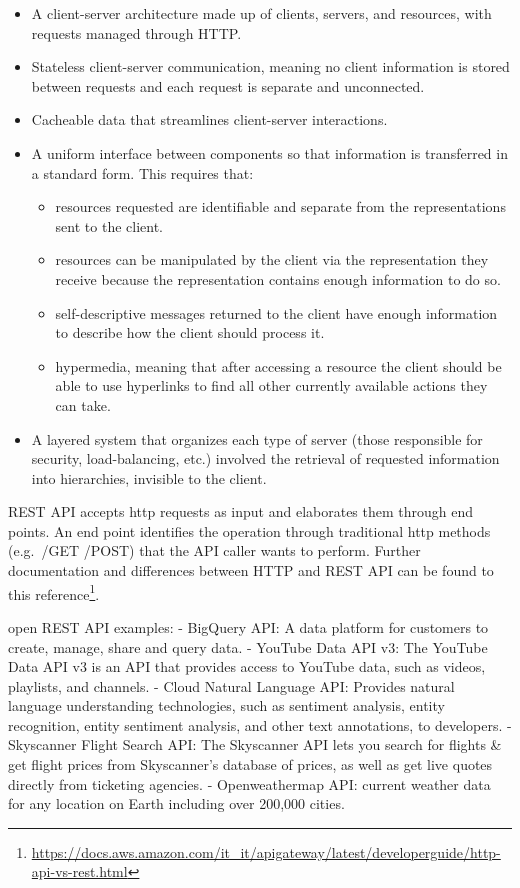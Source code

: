 \documentclass[
  12pt,
  a4paper,
  oneside]{book}
\DeclareRobustCommand{\href}[2]{#2\footnote{\url{#1}}}
\providecommand{\tightlist}{%
  \setlength{\itemsep}{0pt}\setlength{\parskip}{0pt}}
\theoremstyle{definition}
\theoremstyle{definition}
\theoremstyle{definition}
\theoremstyle{remark}
\begin{document}
\begin{itemize}
\tightlist
\item
  A client-server architecture made up of clients, servers, and resources, with requests managed through HTTP.
\item
  Stateless client-server communication, meaning no client information is stored between requests and each request is separate and unconnected.
\item
  Cacheable data that streamlines client-server interactions.
\item
  A uniform interface between components so that information is transferred in a standard form. This requires that:

  \begin{itemize}
  \tightlist
  \item
    resources requested are identifiable and separate from the representations sent to the client.
  \item
    resources can be manipulated by the client via the representation they receive because the representation contains enough information to do so.
  \item
    self-descriptive messages returned to the client have enough information to describe how the client should process it.
  \item
    hypermedia, meaning that after accessing a resource the client should be able to use hyperlinks to find all other currently available actions they can take.
  \end{itemize}
\item
  A layered system that organizes each type of server (those responsible for security, load-balancing, etc.) involved the retrieval of requested information into hierarchies, invisible to the client.
\end{itemize}

REST API accepts http requests as input and elaborates them through end points. An end point identifies the operation through traditional http methods (e.g.~/GET /POST) that the API caller wants to perform. Further documentation and differences between HTTP and REST API can be found to this \href{https://docs.aws.amazon.com/it_it/apigateway/latest/developerguide/http-api-vs-rest.html}{reference}.

open REST API examples:
- BigQuery API: A data platform for customers to create, manage, share and query data.
- YouTube Data API v3: The YouTube Data API v3 is an API that provides access to YouTube data, such as videos, playlists, and channels.
- Cloud Natural Language API: Provides natural language understanding technologies, such as sentiment analysis, entity recognition, entity sentiment analysis, and other text annotations, to developers.
- Skyscanner Flight Search API: The Skyscanner API lets you search for flights \& get flight prices from Skyscanner's database of prices, as well as get live quotes directly from ticketing agencies.
- Openweathermap API: current weather data for any location on Earth including over 200,000 cities.
\end{document}
